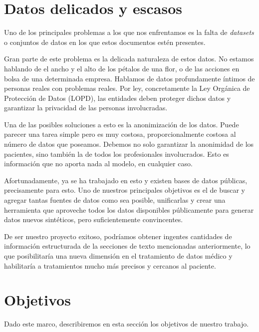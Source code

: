 \section{Datos delicados y escasos}
Uno de los principales problemas a los que nos enfrentamos es la falta de \textit{datasets} o conjuntos de datos en los que estos documentos estén presentes. 

Gran parte de este problema es la delicada naturaleza de estos datos. No estamos hablando de el ancho y el alto de los pétalos de una flor, o de las acciones en bolsa de una determinada empresa. Hablamos de datos profundamente íntimos de personas reales con problemas reales. Por ley, concretamente la Ley Orgánica de Protección de Datos (LOPD), las entidades deben proteger dichos datos y garantizar la privacidad de las personas involucradas.

Una de las posibles soluciones a esto es la anonimización de los datos. Puede parecer una tarea simple pero es muy costosa, proporcionalmente costosa al número de datos que poseamos. Debemos no solo garantizar la anonimidad de los pacientes, sino también la de todos los profesionales involucrados. Esto es información que no aporta nada al modelo, en cualquier caso. 

Afortunadamente, ya se ha trabajado en esto y existen bases de datos públicas, precisamente para esto. Uno de nuestros principales objetivos es el de buscar y agregar tantas fuentes de datos como sea posible, unificarlas y crear una herramienta que aproveche todos los datos disponibles públicamente para generar datos nuevos sintéticos, pero suficientemente convincentes.

De ser nuestro proyecto exitoso, podríamos obtener ingentes cantidades de información estructurada de la secciones de texto mencionadas anteriormente, lo que posibilitaría una nueva dimensión en el tratamiento de datos médico y habilitaría a tratamientos mucho más precisos y cercanos al paciente.

\section{Objetivos}
Dado este marco, describiremos en esta sección los objetivos de nuestro trabajo.

